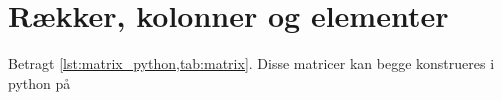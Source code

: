 \section{Rækker, kolonner og elementer}
Betragt \cref{lst:matrix_python,tab:matrix}.
Disse matricer kan begge konstrueres i python på 